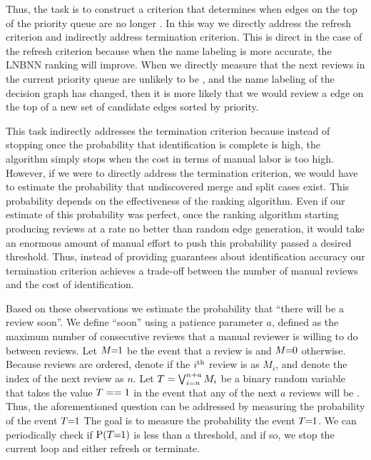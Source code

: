 Thus, the task is to construct a criterion that determines when edges on the top of the priority queue are no
  longer \meaningful{}.
In this way we directly address the refresh criterion and indirectly address termination criterion.
This is direct in the case of the refresh criterion because when the name labeling is more accurate, the LNBNN
  ranking will improve.
When we directly measure that the next reviews in the current priority queue are unlikely to be \meaningful{}, and
  the name labeling of the decision graph has changed, then it is more likely that we would review a \meaningful{}
  edge on the top of a new set of candidate edges sorted by priority.

This task indirectly addresses the termination criterion because instead of stopping once the probability that
  identification is complete is high, the algorithm simply stops when the cost in terms of manual labor is too
  high.
However, if we were to directly address the termination criterion, we would have to estimate the probability that
  undiscovered merge and split cases exist.
This probability depends on the effectiveness of the ranking algorithm.
Even if our estimate of this probability was perfect, once the ranking algorithm starting producing \meaningful{}
  reviews at a rate no better than random edge generation, it would take an enormous amount of manual effort to
  push this probability passed a desired threshold.
Thus, instead of providing guarantees about identification accuracy our termination criterion achieves a
  trade-off between the number of manual reviews and the cost of identification.



Based on these observations we estimate the probability that ``there will be a \meaningful{} review soon''.
We define ``soon'' using a patience parameter $a$, defined as the maximum number of consecutive reviews that a
  manual reviewer is willing to do between \meaningful{} reviews.
Let $M\mkern-6mu=\mkern-6mu1$ be the event that a review is \meaningful{} and $M\mkern-6mu=\mkern-6mu0$ otherwise.
Because reviews are ordered, denote if the $i^{\textrm{th}}$ review is \meaningful{} as $M_i$, and denote the index of the
  next review as $n$.
Let  %
$T = \bigvee_{i=n}^{n+a} M_i$
%
be a binary random variable that takes the value $T==1$ in the event that any of the next $a$ reviews will be
  \meaningful{}.
Thus, the aforementioned question can be addressed by measuring the probability of the event $T\mkern-6mu=\mkern-6mu1$ The goal is
  to measure the probability the event $T\mkern-6mu=\mkern-6mu1$.
We can periodically check if $\mathbin{\operatorname{P}}(T\mkern-6mu=\mkern-6mu1)$ is less than a threshold, and if so, we stop the current loop and
  either refresh or terminate.

